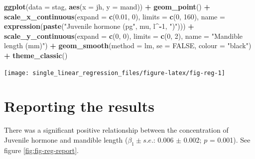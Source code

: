 \documentclass[
]{book}
\newenvironment{Shaded}{\begin{snugshade}}{\end{snugshade}}
\newcommand{\DataTypeTok}[1]{\textcolor[rgb]{0.13,0.29,0.53}{#1}}
\newcommand{\DecValTok}[1]{\textcolor[rgb]{0.00,0.00,0.81}{#1}}
\newcommand{\FloatTok}[1]{\textcolor[rgb]{0.00,0.00,0.81}{#1}}
\newcommand{\KeywordTok}[1]{\textcolor[rgb]{0.13,0.29,0.53}{\textbf{#1}}}
\newcommand{\NormalTok}[1]{#1}
\newcommand{\OperatorTok}[1]{\textcolor[rgb]{0.81,0.36,0.00}{\textbf{#1}}}
\newcommand{\OtherTok}[1]{\textcolor[rgb]{0.56,0.35,0.01}{#1}}
\newcommand{\StringTok}[1]{\textcolor[rgb]{0.31,0.60,0.02}{#1}}
\begin{document}
\begin{Shaded}
\begin{Highlighting}[]
\KeywordTok{ggplot}\NormalTok{(}\DataTypeTok{data =}\NormalTok{ stag, }\KeywordTok{aes}\NormalTok{(}\DataTypeTok{x =}\NormalTok{ jh, }\DataTypeTok{y =}\NormalTok{ mand)) }\OperatorTok{+}
\StringTok{        }\KeywordTok{geom_point}\NormalTok{() }\OperatorTok{+}
\StringTok{        }\KeywordTok{scale_x_continuous}\NormalTok{(}\DataTypeTok{expand =} \KeywordTok{c}\NormalTok{(}\FloatTok{0.01}\NormalTok{, }\DecValTok{0}\NormalTok{),}
                           \DataTypeTok{limits =} \KeywordTok{c}\NormalTok{(}\DecValTok{0}\NormalTok{, }\DecValTok{160}\NormalTok{),}
                           \DataTypeTok{name =} \KeywordTok{expression}\NormalTok{(}\KeywordTok{paste}\NormalTok{(}\StringTok{"Juvenile hormone (pg"}\NormalTok{,}
\NormalTok{                                                   mu,}
\NormalTok{                                                   l}\OperatorTok{^-}\DecValTok{1}\NormalTok{,}
                                                   \StringTok{")"}\NormalTok{))) }\OperatorTok{+}
\StringTok{        }\KeywordTok{scale_y_continuous}\NormalTok{(}\DataTypeTok{expand =} \KeywordTok{c}\NormalTok{(}\DecValTok{0}\NormalTok{, }\DecValTok{0}\NormalTok{),}
                           \DataTypeTok{limits =} \KeywordTok{c}\NormalTok{(}\DecValTok{0}\NormalTok{, }\DecValTok{2}\NormalTok{),}
                           \DataTypeTok{name =} \StringTok{"Mandible length (mm)"}\NormalTok{) }\OperatorTok{+}
\StringTok{        }\KeywordTok{geom_smooth}\NormalTok{(}\DataTypeTok{method =}\NormalTok{ lm, }\DataTypeTok{se =} \OtherTok{FALSE}\NormalTok{, }\DataTypeTok{colour =} \StringTok{"black"}\NormalTok{) }\OperatorTok{+}
\StringTok{        }\KeywordTok{theme_classic}\NormalTok{()}
\end{Highlighting}
\end{Shaded}

\begin{flushleft}\texttt{[image: single\_linear\_regression\_files/figure-latex/fig-reg-1]} \end{flushleft}

\hypertarget{reporting-the-results}{%
\section{Reporting the results}\label{reporting-the-results}}

There was a significant positive relationship between the concentration of Juvenile hormone and mandible length (\(\beta_{1}\pm s.e.\): 0.006 \(\pm\) 0.002; \(p\) = 0.001). See figure \ref{fig:fig-reg-report}.
\end{document}
